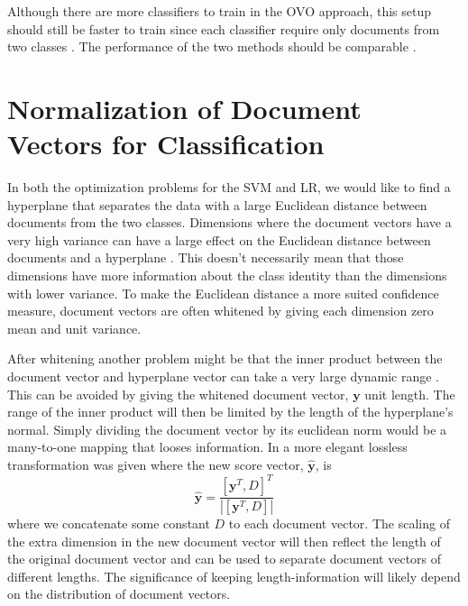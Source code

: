 Although there are more classifiers to train in the OVO approach, this setup should still be faster to train since each classifier require only documents from two classes \cite[832]{lidbok}. The performance of the two methods should be comparable \cite{Rifkin:2004:DOC:1005332.1005336}.

\section{Normalization of Document Vectors for Classification}
\label{sect:svmnormal}

In both the optimization problems for the SVM and LR, we would like to find a hyperplane that separates the data with a large Euclidean distance between documents from the two classes. Dimensions where the document vectors have a very high variance can have a large effect on the Euclidean distance between documents and a hyperplane \cite{wan2005speaker}. This doesn't necessarily mean that those dimensions have more information about the class identity than the dimensions with lower variance. To make the Euclidean distance a more suited confidence measure, document vectors are often whitened by giving each dimension zero mean and unit variance. 

After whitening another problem might be that the inner product between the document vector and hyperplane vector can take a very large dynamic range \cite{wan2005speaker}. This can be avoided by giving the whitened document vector, $\mathbf{y}$ unit length. The range of the inner product will then be limited by the length of the hyperplane's normal. Simply dividing the document vector by its euclidean norm would be a many-to-one mapping that looses information. In \cite{wan2005speaker} a more elegant lossless transformation was given where the new score vector, $\mathbf{\hat{y}}$, is
\begin{equation}
\label{svmnormalize}
\mathbf{\hat{y}} = \frac{[\mathbf{y}^T, D]^T}{|[\mathbf{y}^T, D]|}
\end{equation}
where we concatenate some constant $D$ to each document vector. The scaling of the extra dimension in the new document vector will then reflect the length of the original document vector and can be used to separate document vectors of different lengths. The significance of keeping length-information will likely depend on the distribution of document vectors.